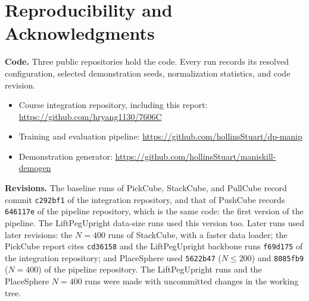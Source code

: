 \section{Reproducibility and Acknowledgments}
\textbf{Code.} Three public repositories hold the code. Every run records its
resolved configuration, selected demonstration seeds, normalization
statistics, and code revision.
\begin{itemize}
  \item Course integration repository, including this report:
  \url{https://github.com/hryang1130/7606C}
  \item Training and evaluation pipeline:
  \url{https://github.com/hollinsStuart/dp-manip}
  \item Demonstration generator:
  \url{https://github.com/hollinsStuart/maniskill-demogen}
\end{itemize}

\textbf{Revisions.} The baseline runs of PickCube, StackCube, and PullCube
record commit \texttt{c292bf1} of the integration repository, and that of
PushCube records \texttt{646117e} of the pipeline repository, which is the
same code: the first version of the pipeline. The LiftPegUpright data-size
runs used this version too. Later runs used later revisions: the $N=400$ runs of
StackCube, with a faster data loader; the PickCube report cites
\texttt{cd36158} and the LiftPegUpright backbone runs \texttt{f69d175} of the
integration repository; and PlaceSphere used \texttt{5622b47} ($N\le200$) and
\texttt{8085fb9} ($N=400$) of the pipeline repository. The LiftPegUpright runs
and the PlaceSphere $N=400$ runs were made with uncommitted changes in the
working tree.

